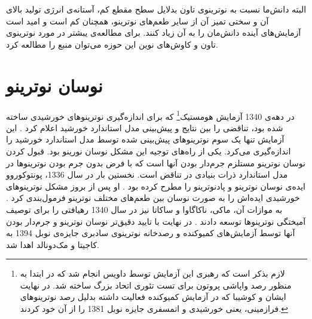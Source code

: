 \documentclass[a4paper]{book}
\begin{document}
البته دانش‌ما نسبت به نوترینوی تاون بدلایل سطح مقطع کم، آستانه‌ی انرژی تولید بالای آن و سختی تمیز آن از سایر طعم‌های نوترینو، همچنان کم است و امید است آزمایش‌های آینده دانش‌مان را به آن زیاد کنند. برای مطالعه‌ی یبشتر در مورد نوترینوی تاون و کاوش‌های نوین این حوزه می‌توان منبع \cite{MammenAbraham:2022xoc} را مطالعه کرد.

\section{نوسان نوترینو}
\label{sec:neutrino-oscillation}
در دهه‌ی 1340 آزمایش هومستیک\footnote{لازم بذکر است که رهبری این آزمایش توسط داویس انجام شد که در ابتدا به منظور رصد واپاشی پروتون برای تست تئوری اتحاد بزرگ ساخته شد. در نهایت ایشان و کوشیبا که در آزمایش کمیوکنده فعالیت داشته بدلیل رصد نوترینوهای فرازمینی، یعنی خورشیدی و اتمسفری جایزه نوبل 1381 را از آن خود کردند.} که برای اندازه‌گیری نوترینوهای خورشیدی ساخته شده بود، تناقضی را بین نتایج و پیش‌بینی مدل استاندارد خورشید اعلام کرد \cite{PhysRevLett.20.1205}. این آزمایش تنها یک سوم نوترینوهای پیش‌بینی شده توسط مدل استاندارد خورشید را اندازه‌گیری می‌کرد. یکی از راه‌های توجیه این مشکل نوسان نورینو بود. قبول کردن نوسان نوترینو مستلزم جرم‌دار بودن آنها است که با فرض بدون جرم بودن نوترینوها در مدل استاندارد ذرات بنیادی در تناقض است.
نخستین بار در سال 1336، پونتوکوروو ایده‌ی نوسان نوترینو و پادنوترینو را مطرح کرده بود \cite{Pontecorvo:1957qd}. او پس از بروز مشکل نوترینوهای خورشیدی ایده‌اش را به صورت نوسان بین طعم‌های مختلف نوترینو فرمول‌بندی کرد \cite{Pontecorvo:1969}. به موازات آن، ماکی، ناکاگاوا و ساکاتا نیز در سال 1340 رهیافتی را برای توصیف آمیختگی نوترینوها توسعه دادند \cite{MNS}.
		در نهایت با تایید دقیق‌تر نوسان نوترینو و جرم‌دار بودن آنها توسط آزمایش‌های کمیوکنده و رصدخانه نوترینوی سادبری جایزه‌ی نوبل 1394 به کاجیتا و مک‌دونالد اهدا شد.
		
\end{document}

